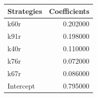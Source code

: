 \begin{tabular}{lr}
\toprule
Strategies & Coefficients \\
\midrule
k60r & 0.202000 \\
k91r & 0.198000 \\
k40r & 0.110000 \\
k76r & 0.072000 \\
k67r & 0.086000 \\
Intercept & 0.795000 \\
\bottomrule
\end{tabular}
